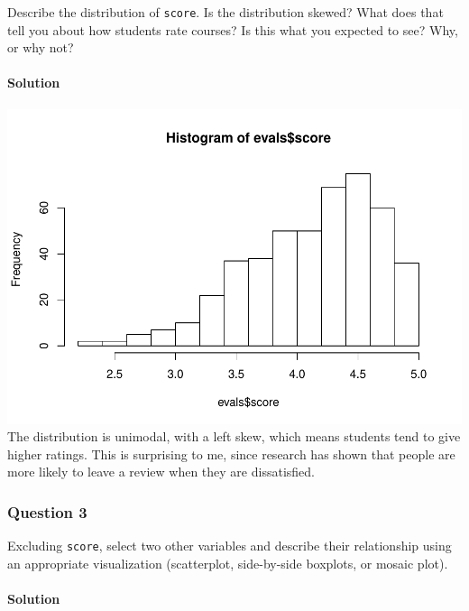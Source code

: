 \documentclass[]{article}
\newenvironment{Shaded}{\begin{snugshade}}{\end{snugshade}}
\newcommand{\KeywordTok}[1]{\textcolor[rgb]{0.13,0.29,0.53}{\textbf{#1}}}
\newcommand{\OperatorTok}[1]{\textcolor[rgb]{0.81,0.36,0.00}{\textbf{#1}}}
\newcommand{\NormalTok}[1]{#1}
\let\oldparagraph\paragraph
\renewcommand{\paragraph}[1]{\oldparagraph{#1}\mbox{}}
\begin{document}
Describe the distribution of \texttt{score}. Is the distribution skewed?
What does that tell you about how students rate courses? Is this what
you expected to see? Why, or why not?

\paragraph{Solution}\label{solution-1}

\begin{Shaded}
\end{Shaded}

\includegraphics{multiple_regression_files/figure-latex/quest-2-1.pdf}
The distribution is unimodal, with a left skew, which means students
tend to give higher ratings. This is surprising to me, since research
has shown that people are more likely to leave a review when they are
dissatisfied.

\subsubsection{Question 3}\label{question-3}

Excluding \texttt{score}, select two other variables and describe their
relationship using an appropriate visualization (scatterplot,
side-by-side boxplots, or mosaic plot).

\paragraph{Solution}\label{solution-2}
\end{document}
